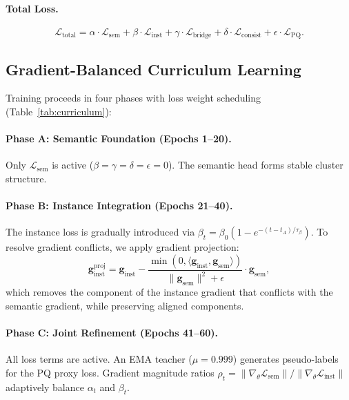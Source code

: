\documentclass{article}
\newcommand{\lsem}{\mathcal{L}_{\text{sem}}}
\newcommand{\linst}{\mathcal{L}_{\text{inst}}}
\newcommand{\lbridge}{\mathcal{L}_{\text{bridge}}}
\newcommand{\lconsist}{\mathcal{L}_{\text{consist}}}
\newcommand{\lpq}{\mathcal{L}_{\text{PQ}}}
\newcommand{\ltotal}{\mathcal{L}_{\text{total}}}
\begin{document}
\paragraph{Total Loss.}
\begin{equation}
\ltotal = \alpha \cdot \lsem + \beta \cdot \linst + \gamma \cdot \lbridge + \delta \cdot \lconsist + \epsilon \cdot \lpq.
\label{eq:total_loss}
\end{equation}


\subsection{Gradient-Balanced Curriculum Learning}
\label{sec:curriculum}

Training proceeds in four phases with loss weight scheduling (Table~\ref{tab:curriculum}):

\paragraph{Phase A: Semantic Foundation (Epochs 1--20).}
Only $\lsem$ is active ($\beta = \gamma = \delta = \epsilon = 0$). The semantic head forms stable cluster structure.

\paragraph{Phase B: Instance Integration (Epochs 21--40).}
The instance loss is gradually introduced via $\beta_t = \beta_0 (1 - e^{-(t - t_A)/\tau_\beta})$. To resolve gradient conflicts, we apply gradient projection:
\begin{equation}
\mathbf{g}_{\text{inst}}^{\text{proj}} = \mathbf{g}_{\text{inst}} - \frac{\min(0, \langle \mathbf{g}_{\text{inst}}, \mathbf{g}_{\text{sem}} \rangle)}{\|\mathbf{g}_{\text{sem}}\|^2 + \epsilon} \cdot \mathbf{g}_{\text{sem}},
\label{eq:grad_proj}
\end{equation}
which removes the component of the instance gradient that conflicts with the semantic gradient, while preserving aligned components.

\paragraph{Phase C: Joint Refinement (Epochs 41--60).}
All loss terms are active. An EMA teacher ($\mu = 0.999$) generates pseudo-labels for the PQ proxy loss. Gradient magnitude ratios $\rho_t = \|\nabla_\theta \lsem\| / \|\nabla_\theta \linst\|$ adaptively balance $\alpha_t$ and $\beta_t$.
\end{document}
